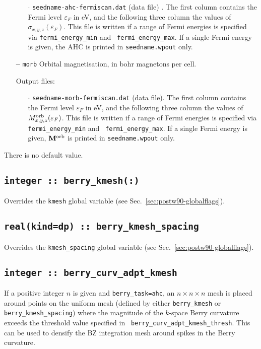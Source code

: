 \begin{itemize}
\begin{itemize}

\item[$\cdot$] {\tt seedname-ahc-fermiscan.dat} (data file) . The
  first column contains the Fermi level $\varepsilon_F$ in eV, and the
  following three column the values of
  $\sigma_{x,y,z}(\varepsilon_F)$.  This file is written if a range of
  Fermi energies is specified via {\tt fermi\_energy\_min} and {\tt
    fermi\_energy\_max}.  If a single Fermi energy is given, the AHC
  is printed in {\tt seedname.wpout} only.

\end{itemize}

\item[{\bf --}] \verb#morb# Orbital magnetisation, in bohr magnetons
  per cell.

Output files:

\begin{itemize}

\item[$\cdot$] {\tt seedname-morb-fermiscan.dat} (data file). The
  first column contains the Fermi level $\varepsilon_F$ in eV, and the
  following three column the values of $M^{\rm
    orb}_{x,y,z}(\varepsilon_F)$.  This file is written if a range of
  Fermi energies is specified via {\tt fermi\_energy\_min} and {\tt
    fermi\_energy\_max}.  If a single Fermi energy is given, ${\bf
    M}^{\rm orb}$ is printed in {\tt seedname.wpout} only.

\end{itemize}

\end{itemize}
There is no default value.


\subsection[berry\_kmesh]{\tt integer :: berry\_kmesh(:)}
Overrides the \verb#kmesh# global variable (see
Sec.~\ref{sec:postw90-globalflags}).

\subsection[berry\_kmesh\_spacing]{\tt real(kind=dp) ::
  berry\_kmesh\_spacing}
Overrides the \verb#kmesh_spacing# global variable (see
Sec.~\ref{sec:postw90-globalflags}).


\subsection[berry\_adpt\_kmesh]{\tt integer :: berry\_curv\_adpt\_kmesh}
If a positive integer $n$ is given and {\tt berry\_task=ahc}, an
$n\times n\times n$ mesh is placed around points on the uniform mesh
(defined by either {\tt berry\_kmesh} or {\tt berry\_kmesh\_spacing})
where the magnitude of the $k$-space Berry curvature exceeds the
threshold value specified in {\tt
  berry\_curv\_adpt\_kmesh\_thresh}. This can be used to densify the
BZ integration mesh around spikes in the Berry curvature.

